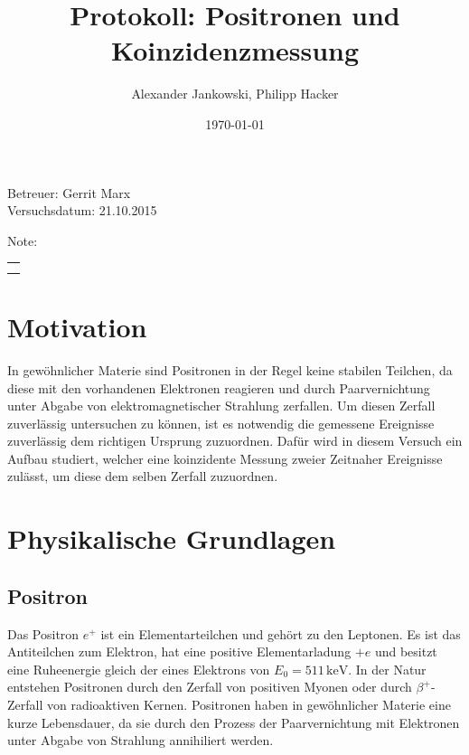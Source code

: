 \documentclass[numbers=noenddot,12pt,a4paper]{scrartcl}
\title{Protokoll: Positronen und Koinzidenzmessung}
\author{Alexander Jankowski, Philipp Hacker}
\date{\today}
\begin{document}
	\maketitle
	\begin{center}
		Betreuer: Gerrit Marx \\ 
		Versuchsdatum: 21.10.2015\\ 
		\begin{table}[h]
			\centering
			Note: 
			\begin{tabularx}{1.5cm}{|X|}
				\hline \\ \\
				\hline
			\end{tabularx}
		\end{table}
	\end{center}
	\vspace*{\fill}
	\tableofcontents
	\vfill
	\newpage

\section{Motivation}
In gewöhnlicher Materie sind Positronen in der Regel keine stabilen Teilchen, da diese mit den vorhandenen Elektronen reagieren und durch Paarvernichtung unter Abgabe von elektromagnetischer Strahlung zerfallen. Um diesen Zerfall zuverlässig untersuchen zu können, ist es notwendig die gemessene Ereignisse zuverlässig dem richtigen Ursprung zuzuordnen. Dafür wird in diesem Versuch ein Aufbau studiert, welcher eine koinzidente Messung zweier Zeitnaher Ereignisse zulässt, um diese dem selben Zerfall zuzuordnen.
\newpage

\section{Physikalische Grundlagen}

	\subsection{Positron}
		
		Das Positron $e^+$ ist ein Elementarteilchen und gehört zu den Leptonen. Es ist das Antiteilchen zum Elektron, hat eine positive Elementarladung $+e$ und besitzt eine Ruheenergie gleich der eines Elektrons von $E_0 = 511\,\mathrm{keV}$. In der Natur entstehen Positronen durch den Zerfall von positiven Myonen oder durch $\beta^+$-Zerfall von radioaktiven Kernen. Positronen haben in gewöhnlicher Materie eine kurze Lebensdauer, da sie durch den Prozess der Paarvernichtung mit Elektronen unter Abgabe von Strahlung annihiliert werden.
\end{document}
